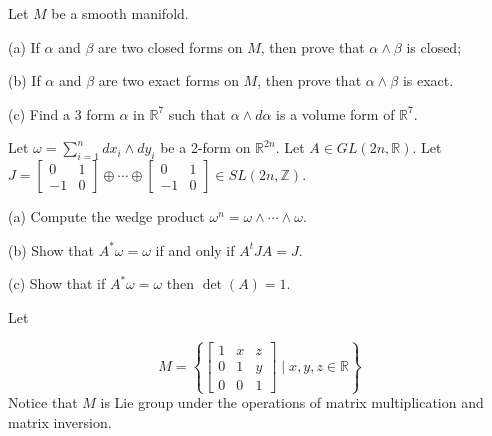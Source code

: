\documentclass[10pt]{article}
\begin{document}
\newpage
Let $M$ be a smooth manifold.

(a) If $\alpha$ and $\beta$ are two closed forms on $M$, then prove that $\alpha \wedge \beta$ is closed;

(b) If $\alpha$ and $\beta$ are two exact forms on $M$, then prove that $\alpha \wedge \beta$ is exact.

(c) Find a 3 form $\alpha$ in $\mathbb{R}^{7}$ such that $\alpha \wedge d \alpha$ is a volume form of $\mathbb{R}^{7}$.

\newpage
Let $\omega=\sum_{i=1}^{n} d x_{i} \wedge d y_{i}$ be a 2-form on $\mathbb{R}^{2 n}$. Let $A \in G L(2 n, \mathbb{R})$. Let $J=\left[\begin{array}{cc}0 & 1 \\ -1 & 0\end{array}\right] \oplus \cdots \oplus\left[\begin{array}{cc}0 & 1 \\ -1 & 0\end{array}\right] \in S L(2 n, \mathbb{Z}) .$

(a) Compute the wedge product $\omega^{n}=\omega \wedge \cdots \wedge \omega$.

(b) Show that $A^{*} \omega=\omega$ if and only if $A^{t} J A=J$.

(c) Show that if $A^{*} \omega=\omega$ then $\operatorname{det}(A)=1$.

\newpage
Let

$$
M=\left\{\left[\begin{array}{ccc}
1 & x & z \\
0 & 1 & y \\
0 & 0 & 1
\end{array}\right] \mid x, y, z \in \mathbb{R}\right\}
$$
Notice that $M$ is Lie group under the operations of matrix multiplication and matrix inversion.
\end{document}
